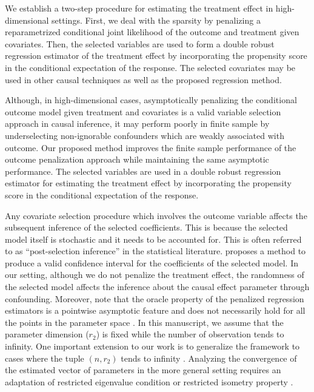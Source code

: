 \documentclass[11pt]{statsoc}
\begin{document}
We establish a two-step procedure for estimating the treatment effect in high-dimensional settings. First, we deal with the sparsity by penalizing a reparametrized conditional joint likelihood of the outcome and treatment given covariates. Then, the selected variables are used to form a double robust regression estimator of the treatment effect by incorporating the propensity score in the conditional expectation of the
response. The selected covariates may be used in other causal
techniques as well as the proposed regression method. 

Although, in high-dimensional cases, asymptotically penalizing the conditional outcome model given treatment and covariates is a valid variable selection approach in causal inference, it may perform poorly in finite sample by underselecting non-ignorable confounders which are weakly associated with outcome. Our proposed method improves the finite sample performance of the outcome penalization approach while maintaining the same asymptotic performance. The selected variables are used in a double robust regression estimator for estimating the treatment effect by
incorporating the propensity score in the conditional expectation of the
response.

 Any covariate selection procedure which involves the outcome variable affects the subsequent inference of the selected coefficients. This is because the selected model itself is stochastic and it needs to be accounted for. This is often referred to as ``post-selection inference'' in the statistical literature.   \cite{berk2012valid} proposes a method to produce a valid confidence interval for the coefficients of the selected model. In our setting, although we do not penalize the treatment effect, the randomness of the selected model affects the inference about the causal effect parameter through confounding. 
Moreover, note that the oracle property of the penalized regression estimators is a pointwise asymptotic feature and does not necessarily hold for all the points in the parameter space \citep{leeb2005model, leeb2008sparse}. In this manuscript, we assume that the parameter dimension ($r_2$) is fixed while the number of observation tends to infinity. One important extension to our work is to generalize the framework to cases where the tuple $(n,r_2)$ tends to infinity \citep{negahban2009unified}.  Analyzing the convergence of the estimated vector of parameters in the more general setting requires an adaptation of restricted eigenvalue condition \citep{bickel2009simultaneous} or restricted isometry property \citep{candes2007dantzig}.
\end{document}

